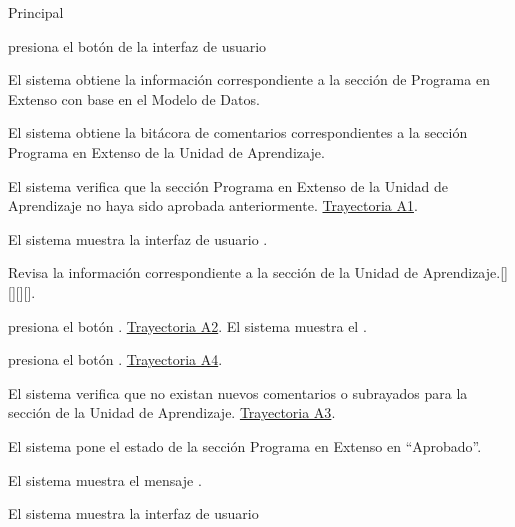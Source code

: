 \begin{UCtrayectoria}{Principal}

    \UCpaso[\UCactor] presiona el botón   de la interfaz de usuario 

    \UCpaso El sistema obtiene la información correspondiente a la sección de Programa en Extenso con base en el Modelo de Datos.
    
    \UCpaso El sistema obtiene la bitácora de comentarios correspondientes a la sección Programa en Extenso de la Unidad de Aprendizaje. 
    
    \UCpaso El sistema verifica que la sección Programa en Extenso de la Unidad de Aprendizaje no haya sido aprobada anteriormente.  \hyperlink{SP2-CU6-A1}{Trayectoria A1}. 
    
    \UCpaso El sistema muestra la interfaz de usuario  .
    
    \UCpaso[\UCactor] Revisa la información correspondiente a la sección de la Unidad de Aprendizaje.[][][][].
    
    \UCpaso[\UCactor] presiona el botón . \hyperlink{SP2-CU6-A2}{Trayectoria A2}.
    \UCpaso El sistema muestra el .
    
    \UCpaso [\UCactor] presiona el botón . \hyperlink{SP2-CU6-A4}{Trayectoria A4}.
    
    \UCpaso	El sistema verifica que no existan nuevos comentarios o subrayados para la sección de la Unidad de Aprendizaje. \hyperlink{SP2-CU6-A3}{Trayectoria A3}. 
    
    \UCpaso El sistema pone el estado de la sección Programa en Extenso en “Aprobado”.
    
    \UCpaso El sistema muestra el mensaje .

    \UCpaso El sistema muestra la interfaz de usuario 

\end{UCtrayectoria}


